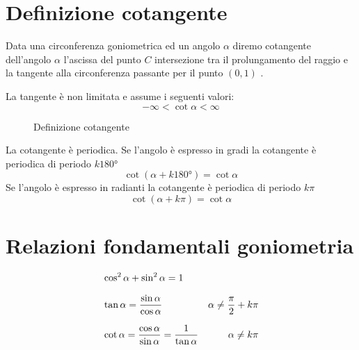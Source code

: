 \section{Definizione cotangente}
\begin{defn}
	Data una circonferenza goniometrica ed un angolo $\alpha$ diremo cotangente dell'angolo $\alpha$ l'ascissa del punto $C$ intersezione tra il prolungamento del raggio e la tangente alla circonferenza passante per il punto $(0,1)$  .
\end{defn}
\begin{prop}\label{prop:cotangentenonlimitata}
	La tangente è non limitata e assume i seguenti valori:
	\begin{equation*}
	-\infty<\cot\alpha< \infty
	\end{equation*}
\end{prop}
\begin{figure}
	\centering
	
	\caption{Definizione cotangente}
	\label{fig:cotangentedefinizione}
\end{figure}
%	
\begin{prop}\label{prop:PeriodoCotangente}
	La cotangente è periodica.
	Se l'angolo è espresso in gradi la cotangente è periodica di periodo $k\ang{180}$
	\begin{equation*}
	\cot(\alpha+k\ang{180;;})=\cot\alpha
	\end{equation*}
	Se l'angolo è espresso in radianti la cotangente è periodica di periodo $k\pi$
	\begin{equation*}
	\cot(\alpha+k\pi)=\cot\alpha
	\end{equation*}
\end{prop}

\section{Relazioni fondamentali goniometria}\label{sec:relazioni-fondamentali-goniometria}
\begin{align*}	
	&\cos^{2}\alpha+\sin^{2}\alpha=1\\[.25cm]\index{Goniometria!relazione!fondamentale}
	&\tan\alpha={}\dfrac{\sin\alpha}{\cos\alpha}&\alpha\neq\dfrac{\pi}{2}+k\pi\\[.25cm]\index{Tangente!definizione}
	&\cot\alpha={}\dfrac{\cos\alpha}{\sin\alpha}={}\dfrac{1}{\tan\alpha}&\alpha\neq k\pi\index{Cotangente!definizione}
\end{align*}
